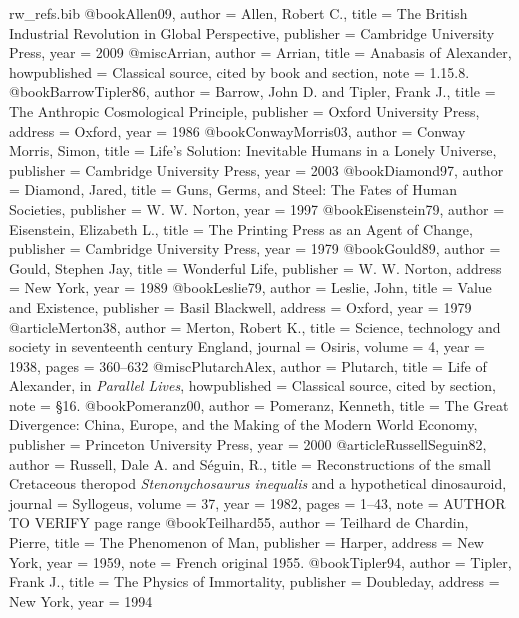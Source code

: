\begin{filecontents}[overwrite]{rw_refs.bib}
@book{Allen09,
  author    = {Allen, Robert C.},
  title     = {The British Industrial Revolution in Global Perspective},
  publisher = {Cambridge University Press},
  year      = {2009}
}
@misc{Arrian,
  author       = {Arrian},
  title        = {Anabasis of Alexander},
  howpublished = {Classical source, cited by book and section},
  note         = {1.15.8.}
}
@book{BarrowTipler86,
  author    = {Barrow, John D. and Tipler, Frank J.},
  title     = {The Anthropic Cosmological Principle},
  publisher = {Oxford University Press},
  address   = {Oxford},
  year      = {1986}
}
@book{ConwayMorris03,
  author    = {Conway Morris, Simon},
  title     = {Life's Solution: Inevitable Humans in a Lonely Universe},
  publisher = {Cambridge University Press},
  year      = {2003}
}
@book{Diamond97,
  author    = {Diamond, Jared},
  title     = {Guns, Germs, and Steel: The Fates of Human Societies},
  publisher = {W. W. Norton},
  year      = {1997}
}
@book{Eisenstein79,
  author    = {Eisenstein, Elizabeth L.},
  title     = {The Printing Press as an Agent of Change},
  publisher = {Cambridge University Press},
  year      = {1979}
}
@book{Gould89,
  author    = {Gould, Stephen Jay},
  title     = {Wonderful Life},
  publisher = {W. W. Norton},
  address   = {New York},
  year      = {1989}
}
@book{Leslie79,
  author    = {Leslie, John},
  title     = {Value and Existence},
  publisher = {Basil Blackwell},
  address   = {Oxford},
  year      = {1979}
}
@article{Merton38,
  author  = {Merton, Robert K.},
  title   = {Science, technology and society in seventeenth century {E}ngland},
  journal = {Osiris},
  volume  = {4},
  year    = {1938},
  pages   = {360--632}
}
@misc{PlutarchAlex,
  author       = {Plutarch},
  title        = {Life of Alexander, in \emph{Parallel Lives}},
  howpublished = {Classical source, cited by section},
  note         = {\S16.}
}
@book{Pomeranz00,
  author    = {Pomeranz, Kenneth},
  title     = {The Great Divergence: China, Europe, and the Making of the Modern World Economy},
  publisher = {Princeton University Press},
  year      = {2000}
}
@article{RussellSeguin82,
  author  = {Russell, Dale A. and S{\'e}guin, R.},
  title   = {Reconstructions of the small {C}retaceous theropod \emph{Stenonychosaurus inequalis} and a hypothetical dinosauroid},
  journal = {Syllogeus},
  volume  = {37},
  year    = {1982},
  pages   = {1--43},
  note    = {AUTHOR TO VERIFY page range}
}
@book{Teilhard55,
  author    = {Teilhard de Chardin, Pierre},
  title     = {The Phenomenon of Man},
  publisher = {Harper},
  address   = {New York},
  year      = {1959},
  note      = {French original 1955.}
}
@book{Tipler94,
  author    = {Tipler, Frank J.},
  title     = {The Physics of Immortality},
  publisher = {Doubleday},
  address   = {New York},
  year      = {1994}
}
\end{filecontents}
